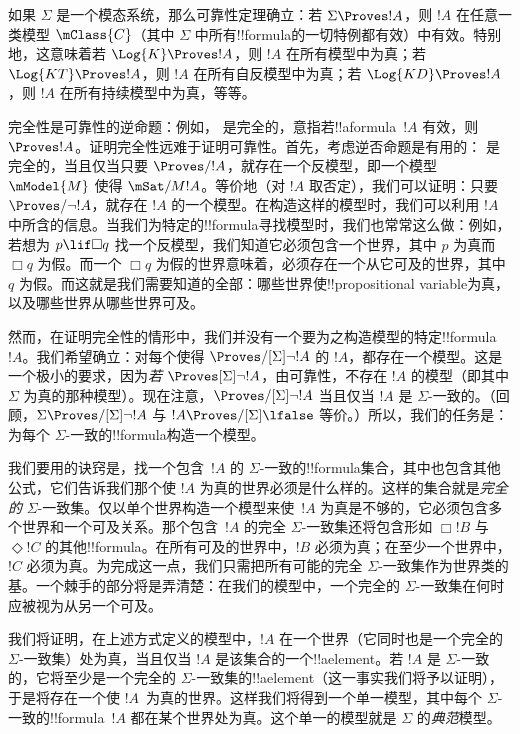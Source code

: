 \documentclass[../../../include/open-logic-section]{subfiles}
\begin{document}


如果 $\Sigma$ 是一个模态系统，那么可靠性定理确立：若 $\Sigma \Proves !A$，则 $!A$ 在任意一类模型 $\mClass{C}$（其中 $\Sigma$ 中所有!!{formula}的一切特例都有效）中有效。特别地，这意味着若 $\Log{K} \Proves !A$，则 $!A$ 在所有模型中为真；若 $\Log{KT} \Proves !A$，则 $!A$ 在所有自反模型中为真；若 $\Log{KD} \Proves !A$，则 $!A$ 在所有持续模型中为真，等等。

完全性是可靠性的逆命题：例如， 是完全的，意指若!!a{formula}~$!A$ 有效，则 $\Proves !A$。证明完全性远难于证明可靠性。首先，考虑逆否命题是有用的： 是完全的，当且仅当只要 $\Proves/ !A$，就存在一个反模型，即一个模型~$\mModel{M}$ 使得 $\mSat/{M}{!A}$。等价地（对 $!A$ 取否定），我们可以证明：只要 $\Proves/ \lnot !A$，就存在 $!A$ 的一个模型。在构造这样的模型时，我们可以利用 $!A$ 中所含的信息。当我们为特定的!!{formula}寻找模型时，我们也常常这么做：例如，若想为 $p \lif \Box q$ 找一个反模型，我们知道它必须包含一个世界，其中 $p$ 为真而 $\Box q$ 为假。而一个 $\Box q$ 为假的世界意味着，必须存在一个从它可及的世界，其中 $q$ 为假。而这就是我们需要知道的全部：哪些世界使!!{propositional variable}为真，以及哪些世界从哪些世界可及。

然而，在证明完全性的情形中，我们并没有一个要为之构造模型的特定!!{formula}~$!A$。我们希望确立：对每个使得 $\Proves/[\Sigma] \lnot !A$ 的 $!A$，都存在一个模型。这是一个极小的要求，因为\emph{若} $\Proves[\Sigma] \lnot !A$，由可靠性，不存在 $!A$ 的模型（即其中 $\Sigma$ 为真的那种模型）。现在注意，$\Proves/[\Sigma] \lnot !A$ 当且仅当 $!A$ 是 $\Sigma$-一致的。（回顾，$\Sigma \Proves/[\Sigma] \lnot !A$ 与 $!A \Proves/[\Sigma] \lfalse$ 等价。）所以，我们的任务是：为每个 $\Sigma$-一致的!!{formula}构造一个模型。

我们要用的诀窍是，找一个包含~$!A$ 的 $\Sigma$-一致的!!{formula}集合，其中也包含其他公式，它们告诉我们那个使 $!A$ 为真的世界必须是什么样的。这样的集合就是\emph{完全的} $\Sigma$-一致集。仅以单个世界构造一个模型来使~$!A$ 为真是不够的，它必须包含多个世界和一个可及关系。那个包含~$!A$ 的完全 $\Sigma$-一致集还将包含形如 $\Box !B$ 与~$\Diamond !C$ 的其他!!{formula}。在所有可及的世界中，$!B$ 必须为真；在至少一个世界中，$!C$ 必须为真。为完成这一点，我们只需把所有可能的完全 $\Sigma$-一致集作为世界类的基。一个棘手的部分将是弄清楚：在我们的模型中，一个完全的 $\Sigma$-一致集在何时应被视为从另一个可及。

我们将证明，在上述方式定义的模型中，$!A$ 在一个世界（它同时也是一个完全的 $\Sigma$-一致集）处为真，当且仅当 $!A$ 是该集合的一个!!a{element}。若 $!A$ 是 $\Sigma$-一致的，它将至少是一个完全的 $\Sigma$-一致集的!!a{element}（这一事实我们将予以证明），于是将存在一个使 $!A$~为真的世界。这样我们将得到一个单一模型，其中每个 $\Sigma$-一致的!!{formula}~$!A$ 都在某个世界处为真。这个单一的模型就是 $\Sigma$ 的\emph{典范}模型。
\end{document}
